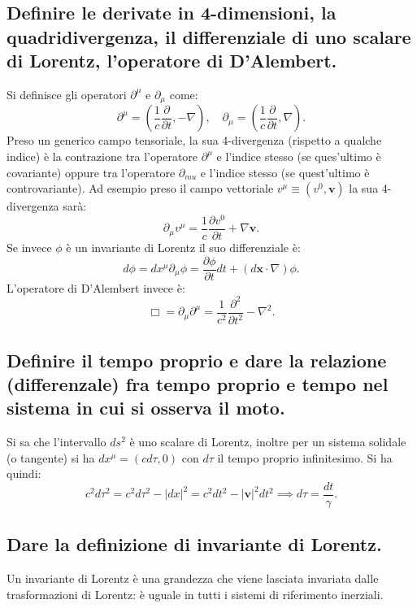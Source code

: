 \subsection[ Operatori differenziali 4-dimensionali]{Definire le derivate in 4-dimensioni, la quadridivergenza, il differenziale di uno scalare di Lorentz, l’operatore di D’Alembert.}
Si definisce gli operatori $\partial^{\mu}$ e $\partial_{\mu}$ come:
\[
	\partial^{\mu} = \left( \frac{1}{c} \frac{\partial}{\partial t} , - \nabla  \right) ,\quad
	\partial_{\mu} = \left(\frac{1}{c} \frac{\partial}{\partial t} ,  \nabla  \right)
.\] 
Preso un generico campo tensoriale, la sua 4-divergenza (rispetto a qualche indice) è la contrazione tra l'operatore $\partial^{\mu}$ e l'indice stesso (se ques'ultimo è covariante) oppure tra l'operatore $\partial_{mu}$ e l'indice stesso (se quest'ultimo è controvariante). Ad esempio preso il campo vettoriale $v^{\mu} \equiv \left(v^{0}, \boldsymbol{v}\right)$ la sua 4-divergenza sarà:
\[
\partial_{\mu}v^{\mu} = \frac{1}{c} \frac{\partial v^{0}}{\partial t} + \nabla \boldsymbol{v} 
.\]
Se invece $\phi$ è un invariante di Lorentz il suo differenziale è:
 \[
	 d\phi = dx^{\mu}\partial_{\mu}\phi = \frac{\partial\phi}{\partial t}dt + \left(d \boldsymbol{x}\cdot \nabla \right)\phi  
.\]
L'operatore di D'Alembert invece è: 
\[
	\Box = \partial_{\mu}\partial^{\mu} = \frac{1}{c^{2}}\frac{\partial^{2}}{\partial t^{2}} - \nabla^2
.\] 
\subsection[ Tempo proprio]{Definire il tempo proprio e dare la relazione (differenzale) fra tempo proprio e tempo nel sistema in cui si osserva il moto.}
Si sa che l'intervallo $ds^{2}$ è uno scalare di Lorentz, inoltre per un sistema solidale (o tangente) si ha $dx^{\mu} = \left( cd\tau, 0 \right)$ con $d\tau$ il tempo proprio infinitesimo. Si ha quindi: 
\[
		c^{2}d\tau^{2} = c^{2}d\tau^{2} - |dx|^{2} = c^{2}dt^{2} -|\boldsymbol{v}|^{2}dt^{2} \implies d\tau = \frac{dt}{\gamma} 
.\] 
\subsection[ Invariante di Lorentz]{Dare la definizione di invariante di Lorentz.} 
Un invariante di Lorentz è una grandezza che viene lasciata invariata dalle trasformazioni di Lorentz: è uguale in tutti i sistemi di riferimento inerziali.
